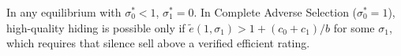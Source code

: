 \label{cor:att_hq}
In any equilibrium with $\sigma_0^*<1$, $\sigma_1^*=0$. In Complete Adverse Selection ($\sigma_0^*=1$), high-quality hiding is possible only if $\tilde e(1,\sigma_1)>1+(c_0+c_1)/b$ for some $\sigma_1$, which requires that silence sell above a verified efficient rating.
